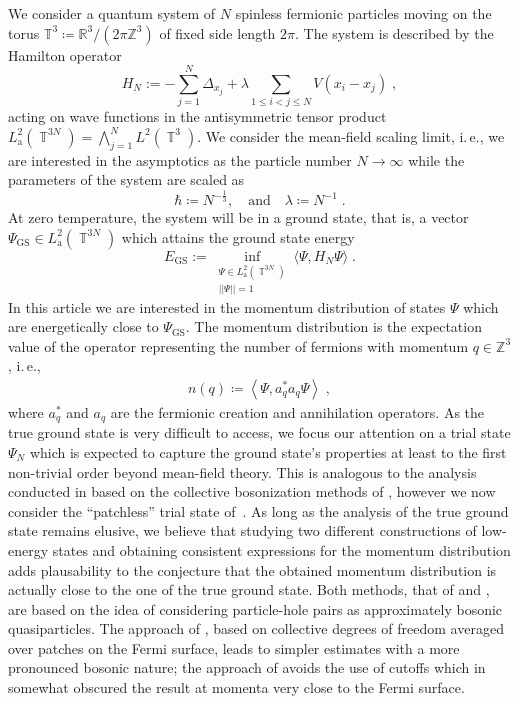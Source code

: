 \documentclass[12pt,a4paper]{article}
\numberwithin{equation}{section}
\newcommand{\Zbb}{\mathbb{Z}}
\newcommand{\1}{\mathbb{I}}
\newcommand{\GS}{\mathrm{GS}}
\newcommand{\Rbb}{\mathbb{R}}
\DeclareMathOperator{\T}{\mathbb{T}}
\newcommand{\eva}[1]{\left\langle #1 \right\rangle}
\theoremstyle{plain}
\theoremstyle{definition}
\theoremstyle{remark}
\theoremstyle{plain}
\theoremstyle{definition}
\theoremstyle{remark}
\begin{document}
We consider a quantum system of $N$ spinless fermionic particles moving on the torus $\mathbb{T}^3\coloneq \Rbb^3/ (2\pi \Zbb^3)$ of fixed side length $2\pi$. The system is described by the Hamilton operator
\begin{equation}
	H_N := - \sum_{j=1}^{N}\Delta_{x_j} + \lambda \sum_{1\leq i < j \leq N } V(x_i - x_j) \;,
\end{equation}
acting on wave functions in the antisymmetric tensor product $L^2_{\mathrm{a}}(\T^{3N}) = \bigwedge_{j=1}^N L^2(\T^3)$.
We consider the mean-field scaling limit, i.\,e., we are interested in the asymptotics as the particle number $N \to \infty$ while the parameters of the system are scaled as
\begin{equation}
	\hbar\coloneq N^{-\frac{1}{3}}, \quad\text{and}\quad \lambda \coloneq N^{-1} \;.
\end{equation}
At zero temperature, the system will be in a ground state, that is, a vector $ \Psi_{\GS} \in L^2_{\mathrm{a}}(\T^{3N}) $ which attains the ground state energy
\begin{equation} \label{eq:EGS}
	E_{\GS}
	:= \inf_{\substack{\Psi \in L^2_{\mathrm{a}}(\T^{3N}) \\||\Psi|| = 1}} \langle \Psi, H_N \Psi \rangle \;.
\end{equation}
In this article we are interested in the momentum distribution of states $ \Psi $ which are energetically close to $ \Psi_{\GS} $. The momentum distribution is the expectation value of the operator representing the number of fermions with momentum $q \in \Zbb^3$, i.\,e.,
\begin{align}
	n(q) \coloneq \eva{\Psi, a^*_q a_q \Psi} \;,
\end{align}
where $ a_q^*$ and $a_q $ are the fermionic creation and annihilation operators. As the true ground state is very difficult to access, we focus our attention on a trial state $ \Psi_N $ which is expected to capture the ground state's properties at least to the first non-trivial order beyond mean-field theory. This is analogous to the analysis conducted in \cite{BL25} based on the collective bosonization methods of \cite{BNPSS20,BNPSS21}, however we now consider the ``patchless'' trial state of~\cite{CHN23}. As long as the analysis of the true ground state remains elusive, we believe that studying two different constructions of low-energy states and obtaining consistent expressions for the momentum distribution adds plausability to the conjecture that the obtained momentum distribution is actually close to the one of the true ground state. Both methods, that of \cite{BL25} and \cite{CHN23}, are based on the idea of considering particle-hole pairs as approximately bosonic quasiparticles. The approach of \cite{BNPSS20,BNPSS21}, based on collective degrees of freedom averaged over patches on the Fermi surface, leads to simpler estimates with a more pronounced bosonic nature; the approach of \cite{CHN23} avoids the use of cutoffs which in \cite{BL25} somewhat obscured the result at momenta very close to the Fermi surface.
\end{document}
